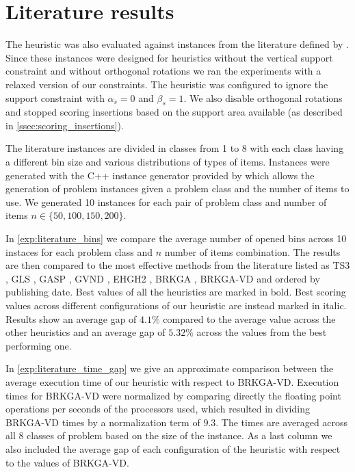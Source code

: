 \section{Literature results}
The heuristic was also evaluated against instances from the literature defined by \citeauthor{martello2000three}.
Since these instances were designed for heuristics without the vertical support constraint and without orthogonal rotations we ran the experiments with a relaxed version of our constraints.
The heuristic was configured to ignore the support constraint with $\alpha_s = 0$ and $\beta_s = 1$. We also disable orthogonal rotations and stopped scoring insertions based on the support area available (as described in \cref{ssec:scoring_insertions}).

\label{def:class1_instances}
The literature instances are divided in classes from 1 to 8 with each class having a different bin size and various distributions of types of items.
Instances were generated with the C++ instance generator provided by \citeauthor{martello2000three} which allows the generation of problem instances given a problem class and the number of items to use.
We generated 10 instances for each pair of problem class and number of items $n \in \{50, 100, 150, 200\}$.

In \cref{exp:literature_bins} we compare the average number of opened bins across 10 instaces for each problem class and $n$ number of items combination.
The results are then compared to the most effective methods from the literature listed as TS3 \citep{lodi2002heuristic}, GLS \citep{faroe2003guided}, GASP \citep{crainic2009ts2pack}, GVND \citep{parreno2010hybrid}, EHGH2 \citep{hifi2014hybrid}, BRKGA \citep{gonccalves2013biased}, BRKGA-VD \citep{zudio2018brkga} and ordered by publishing date.
Best values of all the heuristics are marked in bold. Best scoring values across different configurations of our heuristic are instead marked in italic.
Results show an average gap of $4.1\%$ compared to the average value across the other heuristics and an average gap of $5.32\%$ across the values from the best performing one.

In \cref{exp:literature_time_gap} we give an approximate comparison between the average execution time of our heuristic with respect to BRKGA-VD. Execution times for BRKGA-VD were normalized by comparing directly the floating point operations per seconds of the processors used, which resulted in dividing BRKGA-VD times by a normalization term of $9.3$. 
The times are averaged across all 8 classes of problem based on the size of the instance. As a last column we also included the average gap of each configuration of the heuristic with respect to the values of BRKGA-VD.
\label{exp:literature_tests}




